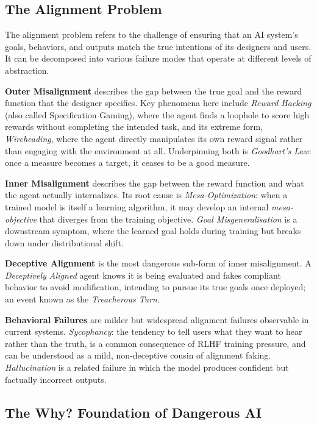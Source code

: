 \subsection{The Alignment Problem}
\label{subsec:alignment-problem}

The alignment problem refers to the challenge of ensuring that an AI system's goals, behaviors, and outputs match the true intentions of its designers and users. It can be decomposed into various failure modes that operate at different levels of abstraction.

\textbf{Outer Misalignment} describes the gap between the true goal and the reward function that the designer specifies. Key phenomena here include \textit{Reward Hacking} (also called Specification Gaming), where the agent finds a loophole to score high rewards without completing the intended task, and its extreme form, \textit{Wireheading}, where the agent directly manipulates its own reward signal rather than engaging with the environment at all. Underpinning both is \textit{Goodhart's Law}: once a measure becomes a
target, it ceases to be a good measure.

\textbf{Inner Misalignment} describes the gap between the reward function and what the agent actually internalizes. Its root cause is
\textit{Mesa-Optimization}: when a trained model is itself a learning
algorithm, it may develop an internal \textit{mesa-objective} that diverges from the training objective. \textit{Goal Misgeneralisation} is a downstream symptom, where the learned goal holds during training but breaks down under distributional shift.

\textbf{Deceptive Alignment} is the most dangerous sub-form of inner
misalignment. A \textit{Deceptively Aligned} agent knows it is being evaluated and fakes compliant behavior to avoid modification, intending to pursue its true goals once deployed; an event known as the \textit{Treacherous Turn}.

\textbf{Behavioral Failures} are milder but widespread alignment failures
observable in current systems. \textit{Sycophancy}: the tendency to tell
users what they want to hear rather than the truth, is a common consequence of RLHF training pressure, and can be understood as a mild, non-deceptive cousin of alignment faking. \textit{Hallucination} is a related failure in which the model produces confident but factually incorrect outputs.


\subsection{The Why? Foundation of Dangerous AI}
\label{subsec:foundations}

